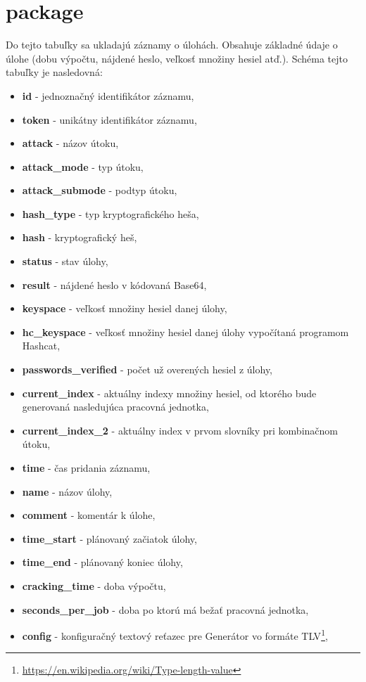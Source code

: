 \documentclass[zadani,slovak]{fitthesis}
\begin{document}
\section{package}
Do tejto tabuľky sa ukladajú záznamy o úlohách. Obsahuje základné údaje o úlohe (dobu výpočtu, nájdené heslo, veľkosť množiny hesiel atď.). Schéma tejto tabuľky je nasledovná:
\begin{itemize}
    \item \textbf{id} - jednoznačný identifikátor záznamu,
    \item \textbf{token} - unikátny identifikátor záznamu,
    \item \textbf{attack} - názov útoku,
    \item \textbf{attack\_mode} - typ útoku,
    \item \textbf{attack\_submode} - podtyp útoku,
    \item \textbf{hash\_type} - typ kryptografického heša,
    \item \textbf{hash} - kryptografický heš,
    \item \textbf{status} - stav úlohy,
    \item \textbf{result} - nájdené heslo v kódovaná Base64,
    \item \textbf{keyspace} - veľkosť množiny hesiel danej úlohy,
    \item \textbf{hc\_keyspace} - veľkosť množiny hesiel danej úlohy vypočítaná programom Hashcat,
    \item \textbf{passwords\_verified} -  počet už overených hesiel z úlohy,
    \item \textbf{current\_index} - aktuálny indexy množiny hesiel, od ktorého bude generovaná nasledujúca pracovná jednotka,
    \item \textbf{current\_index\_2} - aktuálny index v prvom slovníky pri kombinačnom útoku,
    \item \textbf{time} - čas pridania záznamu,
    \item \textbf{name} - názov úlohy,
    \item \textbf{comment} - komentár k úlohe,
    \item \textbf{time\_start} - plánovaný začiatok úlohy,
    \item \textbf{time\_end} - plánovaný koniec úlohy,
    \item \textbf{cracking\_time} - doba výpočtu,
    \item \textbf{seconds\_per\_job} - doba po ktorú má bežať pracovná jednotka,
    \item \textbf{config} - konfiguračný textový reťazec pre Generátor vo formáte TLV\footnote{\url{https://en.wikipedia.org/wiki/Type-length-value}},

\end{itemize}
\end{document}
